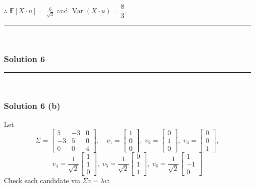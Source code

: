 \documentclass{article}
\begin{document}
{\subsubsection*{\normalfont}{$\therefore$ $\mathbb{E}[X\cdot u]=\frac{6}{\sqrt{3}}$ and $\operatorname{Var}(X\cdot u)=\dfrac{8}{3}$.}

\noindent\rule{\textwidth}{0.4pt}\\

\newpage

\subsubsection*{Solution 6}
\noindent\rule{\textwidth}{0.4pt}\\
\subsubsection*{Solution 6 (b)}
Let
\[
\Sigma=\begin{bmatrix}
5 & -3 & 0\\
-3 & 5 & 0\\
0 & 0 & 4
\end{bmatrix},
\quad
v_1=\begin{bmatrix}1\\0\\0\end{bmatrix},\;
v_2=\begin{bmatrix}0\\1\\0\end{bmatrix},\;
v_3=\begin{bmatrix}0\\0\\1\end{bmatrix},
\]
\[
v_4=\frac{1}{\sqrt{2}}\begin{bmatrix}1\\1\\0\end{bmatrix},\;
v_5=\frac{1}{\sqrt{2}}\begin{bmatrix}0\\1\\1\end{bmatrix},\;
v_6=\frac{1}{\sqrt{2}}\begin{bmatrix}1\\-1\\0\end{bmatrix}
\]
Check each candidate via $\Sigma v=\lambda v$:

}
\end{document}
